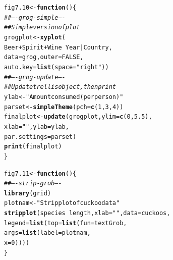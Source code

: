 \documentclass[12pt, a4paper,  BCOR=8.25mm, DIV=15]{scrartcl}\usepackage[]{graphicx}\usepackage[]{color}
\makeatletter
\newcommand{\hlnum}[1]{\textcolor[rgb]{0.686,0.059,0.569}{#1}}%
\newcommand{\hlstr}[1]{\textcolor[rgb]{0.192,0.494,0.8}{#1}}%
\newcommand{\hlcom}[1]{\textcolor[rgb]{0.678,0.584,0.686}{\textit{#1}}}%
\newcommand{\hlopt}[1]{\textcolor[rgb]{0,0,0}{#1}}%
\newcommand{\hlstd}[1]{\textcolor[rgb]{0.345,0.345,0.345}{#1}}%
\newcommand{\hlkwa}[1]{\textcolor[rgb]{0.161,0.373,0.58}{\textbf{#1}}}%
\newcommand{\hlkwb}[1]{\textcolor[rgb]{0.69,0.353,0.396}{#1}}%
\newcommand{\hlkwc}[1]{\textcolor[rgb]{0.333,0.667,0.333}{#1}}%
\newcommand{\hlkwd}[1]{\textcolor[rgb]{0.737,0.353,0.396}{\textbf{#1}}}%
\newenvironment{kframe}{%
 \def\at@end@of@kframe{}%
 \ifinner\ifhmode%
  \def\at@end@of@kframe{\end{minipage}}%
  \begin{minipage}{\columnwidth}%
 \fi\fi%
 \def\FrameCommand##1{\hskip\@totalleftmargin \hskip-\fboxsep
 \colorbox{shadecolor}{##1}\hskip-\fboxsep
     \hskip-\linewidth \hskip-\@totalleftmargin \hskip\columnwidth}%
 \MakeFramed {\advance\hsize-\width
   \@totalleftmargin\z@ \linewidth\hsize
   \@setminipage}}%
 {\par\unskip\endMakeFramed%
 \at@end@of@kframe}
\newenvironment{knitrout}{}{} %
\makeatother
\begin{document}
\begin{knitrout}
\color{fgcolor}\begin{kframe}
\begin{alltt}
\hlstd{fig7.10} \hlkwb{<-} \hlkwa{function}\hlstd{()\{}
\hlcom{## ---- grog-simple ----}
\hlcom{## Simple version of plot}
\hlstd{grogplot} \hlkwb{<-} \hlkwd{xyplot}\hlstd{(}
              \hlstd{Beer}\hlopt{+}\hlstd{Spirit}\hlopt{+}\hlstd{Wine} \hlopt{~} \hlstd{Year} \hlopt{|} \hlstd{Country,}
              \hlkwc{data}\hlstd{=grog,} \hlkwc{outer}\hlstd{=}\hlnum{FALSE}\hlstd{,}
              \hlkwc{auto.key}\hlstd{=}\hlkwd{list}\hlstd{(}\hlkwc{space}\hlstd{=}\hlstr{"right"}\hlstd{))}
\hlcom{## ---- grog-update ----}
\hlcom{## Update trellis object, then print}
\hlstd{ylab} \hlkwb{<-} \hlstr{"Amount consumed (per person)"}
\hlstd{parset} \hlkwb{<-} \hlkwd{simpleTheme}\hlstd{(}\hlkwc{pch}\hlstd{=}\hlkwd{c}\hlstd{(}\hlnum{1}\hlstd{,}\hlnum{3}\hlstd{,}\hlnum{4}\hlstd{))}
\hlstd{finalplot} \hlkwb{<-} \hlkwd{update}\hlstd{(grogplot,} \hlkwc{ylim}\hlstd{=}\hlkwd{c}\hlstd{(}\hlnum{0}\hlstd{,}\hlnum{5.5}\hlstd{),}
                     \hlkwc{xlab}\hlstd{=}\hlstr{""}\hlstd{,} \hlkwc{ylab}\hlstd{=ylab,}
                     \hlkwc{par.settings}\hlstd{=parset)}
\hlkwd{print}\hlstd{(finalplot)}
\hlstd{\}}
\end{alltt}
\end{kframe}
\end{knitrout}

\begin{knitrout}
\color{fgcolor}\begin{kframe}
\begin{alltt}
\hlstd{fig7.11} \hlkwb{<-} \hlkwa{function}\hlstd{()\{}
\hlcom{## ---- strip-grob ----}
\hlkwd{library}\hlstd{(grid)}
\hlstd{plotnam} \hlkwb{<-} \hlstr{"Stripplot of cuckoo data"}
\hlkwd{stripplot}\hlstd{(species} \hlopt{~} \hlstd{length,} \hlkwc{xlab}\hlstd{=}\hlstr{""}\hlstd{,} \hlkwc{data}\hlstd{=cuckoos,}
  \hlkwc{legend}\hlstd{=}\hlkwd{list}\hlstd{(}\hlkwc{top}\hlstd{=}\hlkwd{list}\hlstd{(}\hlkwc{fun}\hlstd{=textGrob,}
                       \hlkwc{args}\hlstd{=}\hlkwd{list}\hlstd{(}\hlkwc{label}\hlstd{=plotnam,}
                                 \hlkwc{x}\hlstd{=}\hlnum{0}\hlstd{))))}
\hlstd{\}}
\end{alltt}
\end{kframe}
\end{knitrout}
\end{document}
